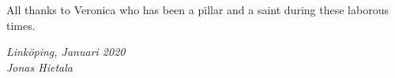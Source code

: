 \begin{acknowledgments}
  All thanks to Veronica who has been a pillar and a saint during these laborous times.

  \addvspace{1em}
  \begin{flushright}
    \textit{%
      Linköping, Januari 2020\\
      Jonas Hietala%
    }
  \end{flushright}
\end{acknowledgments}
